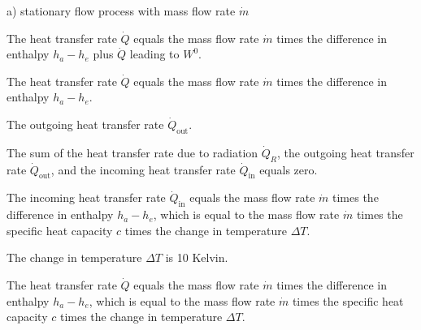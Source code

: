 a) stationary flow process with mass flow rate \( \dot{m} \)

The heat transfer rate \( \dot{Q} \) equals the mass flow rate \( \dot{m} \) times the difference in enthalpy \( h_a - h_e \) plus \( \dot{Q} \) leading to \( W^0 \).

The heat transfer rate \( \dot{Q} \) equals the mass flow rate \( \dot{m} \) times the difference in enthalpy \( h_a - h_e \).

The outgoing heat transfer rate \( \dot{Q}_{\text{out}} \).

The sum of the heat transfer rate due to radiation \( \dot{Q}_R \), the outgoing heat transfer rate \( \dot{Q}_{\text{out}} \), and the incoming heat transfer rate \( \dot{Q}_{\text{in}} \) equals zero.

The incoming heat transfer rate \( \dot{Q}_{\text{in}} \) equals the mass flow rate \( \dot{m} \) times the difference in enthalpy \( h_a - h_e \), which is equal to the mass flow rate \( \dot{m} \) times the specific heat capacity \( c \) times the change in temperature \( \Delta T \).

The change in temperature \( \Delta T \) is 10 Kelvin.

The heat transfer rate \( \dot{Q} \) equals the mass flow rate \( \dot{m} \) times the difference in enthalpy \( h_a - h_e \), which is equal to the mass flow rate \( \dot{m} \) times the specific heat capacity \( c \) times the change in temperature \( \Delta T \).